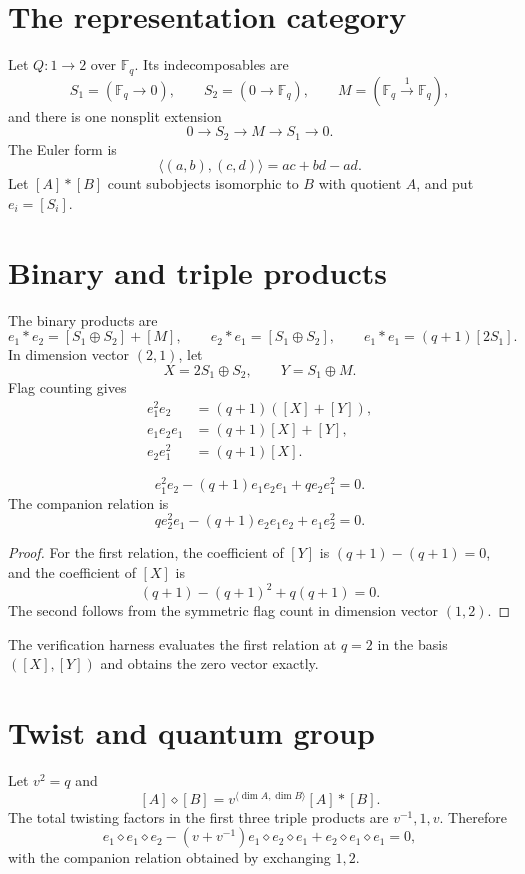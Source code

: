 \section{The representation category}
Let \(Q:1\to2\) over \(\mathbb F_q\).  Its indecomposables are
\[
 S_1=(\mathbb F_q\to0),
 \qquad S_2=(0\to\mathbb F_q),
 \qquad M=(\mathbb F_q\xrightarrow{1}\mathbb F_q),
\]
and there is one nonsplit extension
\[
 0\to S_2\to M\to S_1\to0.
\]
The Euler form is
\[
 \langle(a,b),(c,d)\rangle=ac+bd-ad.
\]
Let \([A]*[B]\) count subobjects isomorphic to \(B\) with quotient \(A\), and put \(e_i=[S_i]\).

\section{Binary and triple products}
The binary products are
\[
 e_1*e_2=[S_1\oplus S_2]+[M],
 \qquad
 e_2*e_1=[S_1\oplus S_2],
 \qquad
 e_1*e_1=(q+1)[2S_1].
\]
In dimension vector \((2,1)\), let
\[
 X=2S_1\oplus S_2,
 \qquad Y=S_1\oplus M.
\]
Flag counting gives
\begin{align*}
 e_1^2e_2&=(q+1)([X]+[Y]),\\
 e_1e_2e_1&=(q+1)[X]+[Y],\\
 e_2e_1^2&=(q+1)[X].
\end{align*}

\begin{theorem}\label{thm:hall-serre}
\[
 e_1^2e_2-(q+1)e_1e_2e_1+qe_2e_1^2=0.
\]
The companion relation is
\[
 qe_2^2e_1-(q+1)e_2e_1e_2+e_1e_2^2=0.
\]
\end{theorem}
\begin{proof}
For the first relation, the coefficient of \([Y]\) is \((q+1)-(q+1)=0\), and the coefficient of \([X]\) is
\[
 (q+1)-(q+1)^2+q(q+1)=0.
\]
The second follows from the symmetric flag count in dimension vector \((1,2)\).
\end{proof}

The verification harness evaluates the first relation at \(q=2\) in the basis \(([X],[Y])\) and obtains the zero vector exactly.

\section{Twist and quantum group}
Let \(v^2=q\) and
\[
 [A]\diamond[B]=v^{\langle\dim A,\dim B\rangle}[A]*[B].
\]
The total twisting factors in the first three triple products are \(v^{-1},1,v\).  Therefore
\[
 e_1\diamond e_1\diamond e_2
 -(v+v^{-1})e_1\diamond e_2\diamond e_1
 +e_2\diamond e_1\diamond e_1=0,
\]
with the companion relation obtained by exchanging \(1,2\).

